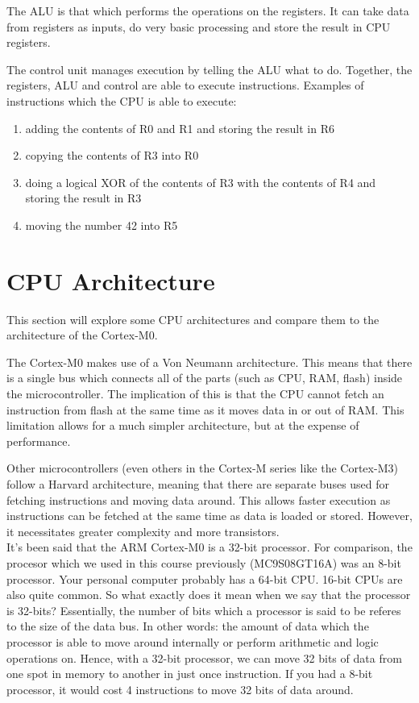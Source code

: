 The ALU is that which performs the operations on the registers. It can take data from registers as inputs, do very basic processing and store the result in CPU registers. 

The control unit manages execution by telling the ALU what to do. Together, the registers, ALU and control are able to execute instructions. 
Examples of instructions which the CPU is able to execute:
\begin{enumerate}
  \item adding the contents of R0 and R1 and storing the result in R6
  \item copying the contents of R3 into R0
  \item doing a logical XOR of the contents of R3 with the contents of R4 and storing the result in R3
  \item moving the number 42 into R5
\end{enumerate}


\section{CPU Architecture}
This section will explore some CPU architectures and compare them to the architecture of the Cortex-M0.

The Cortex-M0 makes use of a Von Neumann architecture. This means that there is a single bus which connects all of the parts (such as CPU, RAM, flash)  inside the microcontroller. The implication of this is that the CPU cannot fetch an instruction from flash at the same time as it moves data in or out of RAM. This limitation allows for a much simpler architecture, but at the expense of performance. 

Other microcontrollers (even others in the Cortex-M series like the Cortex-M3) follow a Harvard architecture, meaning that there are separate buses used for fetching instructions and moving data around. This allows faster execution as instructions can be fetched at the same time as data is loaded or stored. However, it necessitates greater complexity and more transistors. \\

It's been said that the ARM Cortex-M0 is a 32-bit processor. For comparison, the procesor which we used in this course previously (MC9S08GT16A) was an 8-bit processor. Your personal computer probably has a 64-bit CPU. 16-bit CPUs are also quite common. So what exactly does it mean when we say that the processor is 32-bits? Essentially, the number of bits which a processor is said to be referes to the size of the data bus. In other words: the amount of data which the processor is able to move around internally or perform arithmetic and logic operations on. Hence, with a 32-bit processor, we can move 32 bits of data from one spot in memory to another in just once instruction. If you had a 8-bit processor, it would cost 4 instructions to move 32 bits of data around.  

